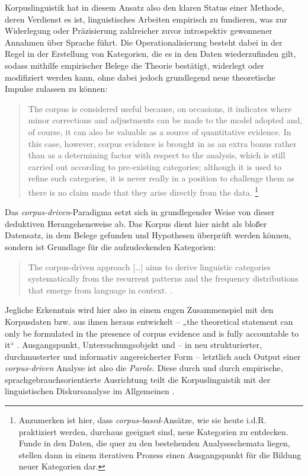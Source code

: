 Korpuslinguistik hat in diesem Ansatz also den klaren Status einer Methode, deren Verdienst es ist, linguistisches Arbeiten empirisch zu fundieren, was zur Widerlegung oder Präzisierung zahlreicher zuvor introspektiv gewonnener Annahmen über Sprache führt. Die Operationalisierung besteht dabei in der Regel in der Erstellung von Kategorien, die es in den Daten wiederzufinden gilt, sodass mithilfe empirischer Belege die Theorie bestätigt, widerlegt oder modifiziert werden kann, ohne dabei jedoch grundlegend neue theoretische Impulse zulassen zu können:

\begin{quote}
The corpus is considered useful because, on occasions, it indicates where minor corrections and adjustments can be made to the model adopted and, of course, it can also be valuable as a source of quantitative evidence. In this case, however, corpus evidence is brought in as an extra bonus rather than as a determining factor with respect to the analysis, which is still carried out according to pre-existing categories; although it is used to refine such categories, it is never really in a position to challenge them as there is no claim made that they arise directly from the data. \autocite[66]{tognini-bonelliCorpusLinguisticsWork2001}\footnote{Anzumerken ist hier, dass \emph{corpus-based}-Ansätze, wie sie heute i.d.R. praktiziert werden, durchaus geeignet sind, neue Kategorien zu entdecken. Funde in den Daten, die quer zu den bestehenden Analyseschemata liegen, stellen dann in einem iterativen Prozess einen Ausgangspunkt für die Bildung neuer Kategorien dar.}
\end{quote}

Das \emph{corpus-driven}-Paradigma setzt sich in grundlegender Weise von dieser deduktiven Herangehensweise ab. Das Korpus dient hier nicht als bloßer Datensatz, in dem Belege gefunden und Hypothesen überprüft werden können, sondern ist Grundlage für die aufzudeckenden Kategorien:

\begin{quote}
The corpus-driven approach {[}\ldots{]} aims to derive linguistic categories systematically from the recurrent patterns and the frequency distributions that emerge from language in context. \autocite[87]{tognini-bonelliCorpusLinguisticsWork2001}.
\end{quote}

Jegliche Erkenntnis wird hier also in einem engen Zusammenspiel mit den Korpusdaten bzw. aus ihnen heraus entwickelt -- „the theoretical statement can only be formulated in the presence of corpus evidence and is fully accountable to it`` \autocite[11]{tognini-bonelliCorpusLinguisticsWork2001}. Ausgangspunkt, Untersuchungsobjekt und -- in neu strukturierter, durchmusterter und informativ angereicherter Form -- letztlich auch Output einer \emph{corpus-driven} Analyse ist also die \emph{Parole}. Diese durch und durch empirische, sprachgebrauchsorientierte Ausrichtung teilt die Korpuslinguistik mit der linguistischen Diskursanalyse im Allgemeinen \autocite[27-29]{spitzmullerDiskurslinguistikEinfuhrungTheorien2011}.

